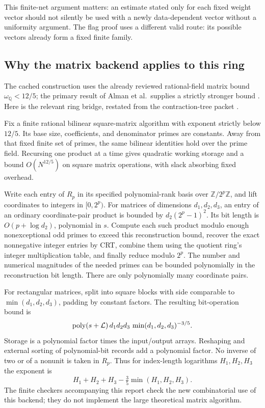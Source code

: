 This finite-net argument matters: an estimate stated only for each
fixed weight vector should not silently be used with a newly
data-dependent vector without a uniformity argument. The flag proof
uses a different valid route: its possible vectors already form a
fixed finite family.

\subsection{Why the matrix backend applies to this ring}
\label{sec:matrix-bridge}

The cached construction uses the already reviewed rational-field
matrix bound $\omega_{\mathbb Q}<12/5$; the primary result of
Alman et al.\ supplies a strictly stronger bound \cite{matrix}.
Here is the relevant ring bridge, restated from the contraction-tree
packet \cite{tree}.

Fix a finite rational bilinear square-matrix algorithm with exponent
strictly below $12/5$. Its base size, coefficients, and denominator
primes are constants. Away from that fixed finite set of primes,
the same bilinear identities hold over the prime field. Recursing
one product at a time gives quadratic working storage and a bound
$O(N^{12/5})$ on square matrix operations, with slack absorbing
fixed overhead.

Write each entry of $R_p$ in its specified polynomial-rank basis
over $\mathbb Z/2^p\mathbb Z$, and lift coordinates to integers in
$[0,2^p)$. For matrices of dimensions $d_1,d_2,d_3$, an entry of an
ordinary coordinate-pair product is bounded by
$d_2(2^p-1)^2$. Its bit length is
$O(p+\log d_2)$, polynomial in $s$.
Compute each such product modulo enough nonexceptional odd primes
to exceed this reconstruction bound, recover the exact nonnegative
integer entries by CRT, combine them using the quotient ring's
integer multiplication table, and finally reduce modulo $2^p$.
The number and numerical magnitudes of the needed primes can be
bounded polynomially in the reconstruction bit length. There are
only polynomially many coordinate pairs.

For rectangular matrices, split into square blocks with side
comparable to $\min(d_1,d_2,d_3)$, padding by constant factors.
The resulting bit-operation bound is
\[
 \operatorname{poly}(s+\mathcal L)\,
 d_1d_2d_3\,\min(d_1,d_2,d_3)^{-3/5}.
\]
Storage is a polynomial factor times the input/output arrays.
Reshaping and external sorting of polynomial-bit records add a
polynomial factor. No inverse of two or of a nonunit is taken in
$R_p$. Thus for index-length logarithms $H_1,H_2,H_3$ the exponent
is
\[
 H_1+H_2+H_3-\tfrac35\min(H_1,H_2,H_3).
\]
The finite checkers accompanying this report check the new combinatorial
use of this backend; they do not implement the large theoretical
matrix algorithm.
